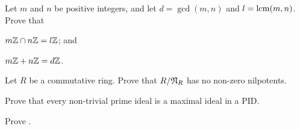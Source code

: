 \begin{problem}
    Let $m$ and $n$ be positive integers, and let $d = \gcd(m,n)$ and $l = \mathrm{lcm}(m,n)$. Prove that
    \begin{partquestions}{\alph*}
        \item $m\mathbb{Z} \cap n\mathbb{Z} = l\mathbb{Z}$; and
        \item $m\mathbb{Z} + n\mathbb{Z} = d\mathbb{Z}$.
    \end{partquestions}
\end{problem}

\begin{problem}
    Let $R$ be a commutative ring. Prove that $R / \mathfrak{N}_{R}$ has no non-zero nilpotents.
\end{problem}

\begin{problem}\label{problem-non-trivial-prime-ideal-is-maximal-in-PID}
    Prove that every non-trivial prime ideal is a maximal ideal in a PID.
\end{problem}

\begin{problem}\label{problem-principal-ideals-equal-iff-associates}
    Prove .
\end{problem}

